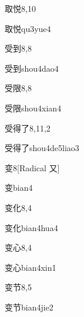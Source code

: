\begin{entry}{取悦}{8,10}
  \begin{phonetics}{取悦}{qu3yue4}
  \end{phonetics}
\end{entry}

\begin{entry}{受到}{8,8}
  \begin{phonetics}{受到}{shou4dao4}
  \end{phonetics}
\end{entry}

\begin{entry}{受限}{8,8}
  \begin{phonetics}{受限}{shou4xian4}
  \end{phonetics}
\end{entry}

\begin{entry}{受得了}{8,11,2}
  \begin{phonetics}{受得了}{shou4de5liao3}
  \end{phonetics}
\end{entry}

\begin{entry}{变}{8}[Radical 又]
  \begin{phonetics}{变}{bian4}
  \end{phonetics}
\end{entry}

\begin{entry}{变化}{8,4}
  \begin{phonetics}{变化}{bian4hua4}
  \end{phonetics}
\end{entry}

\begin{entry}{变心}{8,4}
  \begin{phonetics}{变心}{bian4xin1}
  \end{phonetics}
\end{entry}

\begin{entry}{变节}{8,5}
  \begin{phonetics}{变节}{bian4jie2}
  \end{phonetics}
\end{entry}

